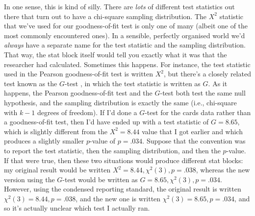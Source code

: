 In one sense, this is kind of silly. There are {\it lots} of different test statistics out there that turn out to have a chi-square sampling distribution. The $X^2$ statistic that we've used for our goodness-of-fit test is only one of many (albeit one of the most commonly encountered ones). In a sensible, perfectly organised world we'd {\it always} have a separate name for the test statistic and the sampling distribution. That way, the stat block itself would tell you exactly what it was that the researcher had calculated. Sometimes this happens. For instance, the test statistic used in the Pearson goodness-of-fit test is written $X^2$, but there's a closely related test known as the $G$-test \parencite{Sokal1994}, in which the test statistic is written as $G$. As it happens, the Pearson goodness-of-fit test and the $G$-test both test the same null hypothesis, and the sampling distribution is exactly the same (i.e., chi-square with $k-1$ degrees of freedom). If I'd done a $G$-test for the cards data rather than a goodness-of-fit test, then I'd have ended up with a test statistic of $G = 8.65$, which is slightly different from the $X^2 = 8.44$ value that I got earlier and which produces a slightly smaller $p$-value of $p = .034$. Suppose that the convention was to report the test statistic, then the sampling distribution, and then the $p$-value. If that were true, then these two situations would produce different stat blocks: my original result would be written $X^2 = 8.44, \chi^2(3), p = .038$, whereas the new version using the $G$-test would be written as $G = 8.65, \chi^2(3), p = .034$. However, using the condensed reporting standard, the original result is written $\chi^2(3) = 8.44, p = .038$, and the new one is written $\chi^2(3) = 8.65, p = .034$, and so it's actually unclear which test I actually ran.  

